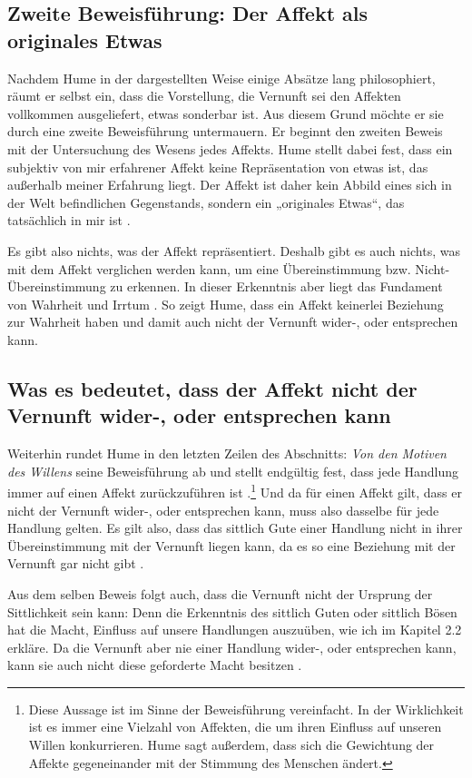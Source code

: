 \documentclass[ngerman,12pt]{diazessay} %
\begin{document}
\begin{doublespace}
\section{Zweite Beweisführung: Der Affekt als originales Etwas}

Nachdem Hume in der dargestellten Weise einige Absätze lang philosophiert, räumt er selbst ein, dass die Vorstellung, die Vernunft sei den Affekten vollkommen ausgeliefert, etwas sonderbar ist. Aus diesem Grund möchte er sie durch eine zweite Beweisführung untermauern. Er beginnt den zweiten Beweis mit der Untersuchung des Wesens jedes Affekts. Hume stellt dabei fest, dass ein subjektiv von mir erfahrener Affekt keine Repräsentation von etwas ist, das außerhalb meiner Erfahrung liegt. Der Affekt ist daher kein Abbild eines sich in der Welt befindlichen Gegenstands, sondern ein „originales Etwas“, das tatsächlich in mir ist \cite[siehe S.486]{Hume.2013}.
\par\bigskip   
Es gibt also nichts, was der Affekt repräsentiert. Deshalb gibt es auch nichts, was mit dem Affekt verglichen werden kann, um eine Übereinstimmung bzw. Nicht-Übereinstimmung zu erkennen. In dieser Erkenntnis aber liegt das Fundament von Wahrheit und Irrtum \cite[siehe S.534]{Hume.2013}. So zeigt Hume, dass ein Affekt keinerlei Beziehung zur Wahrheit haben und damit auch nicht der Vernunft wider-, oder entsprechen kann.

\subsection{Was es bedeutet, dass der Affekt nicht der Vernunft wider-, oder entsprechen kann}

Weiterhin rundet Hume in den letzten Zeilen des Abschnitts: \textit{Von den Motiven des Willens} seine Beweisführung ab und stellt endgültig fest, dass jede Handlung immer auf einen Affekt zurückzuführen ist \cite[siehe S.489]{Hume.2013}.\footnote{Diese Aussage ist im Sinne der Beweisführung vereinfacht. In der Wirklichkeit ist es immer eine Vielzahl von Affekten, die um ihren Einfluss auf unseren Willen konkurrieren. Hume sagt außerdem, dass sich die Gewichtung der Affekte gegeneinander mit der Stimmung des Menschen ändert.} Und da für einen Affekt gilt, dass er nicht der Vernunft wider-, oder entsprechen kann, muss also dasselbe für jede Handlung gelten. Es gilt also, dass das sittlich Gute einer Handlung nicht in ihrer Übereinstimmung mit der Vernunft liegen kann, da es so eine Beziehung mit der Vernunft gar nicht gibt \cite[siehe S.534]{Hume.2013}.
\par\bigskip   
Aus dem selben Beweis folgt auch, dass die Vernunft nicht der Ursprung der Sittlichkeit sein kann: Denn die Erkenntnis des sittlich Guten oder sittlich Bösen hat die Macht, Einfluss auf unsere Handlungen auszuüben, wie ich im Kapitel 2.2 erkläre. Da die Vernunft aber nie einer Handlung wider-, oder entsprechen kann, kann sie auch nicht diese geforderte Macht besitzen \cite[siehe S.534]{Hume.2013}.


\end{doublespace}
\end{document}
